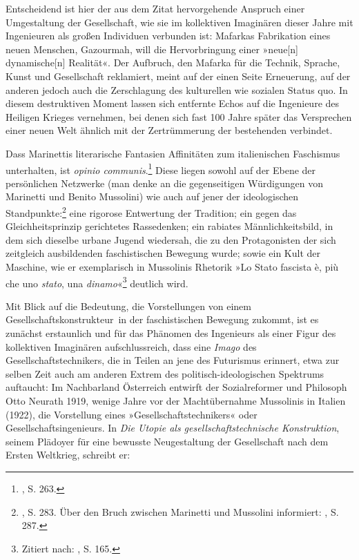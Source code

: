 \documentclass[%
	fontsize=10pt,%
	twoside,%
	headings=optiontoheadandtoc,%
	showtrims]{scrbook}
\renewenvironment{quote}{%
  \addmargin[\genericindent]{0pt}%
  \KOMAoptions{parskip=true}%
  \ifdim\parskip>0pt\else\addvspace{\intextsep}\fi
}{%
  \par
  \endaddmargin\vspace{\intextsep}
}
\renewcommand{\texttt}{\nohyphens} %
\begin{document}
\par Entscheidend ist hier der aus dem Zitat hervorgehende Anspruch einer Umgestaltung der Gesellschaft, wie sie im kollektiven Imaginären dieser Jahre mit Ingenieuren als großen Individuen verbunden ist: Mafarkas Fabrikation eines neuen Menschen, Gazourmah, will die Hervorbringung einer »neue{[}n{]} dynamische{[}n{]} Realität«. Der Aufbruch, den Mafarka für die Technik, Sprache, Kunst und Gesellschaft reklamiert, meint auf der einen Seite Erneuerung, auf der anderen jedoch auch die Zerschlagung des kulturellen wie sozialen Status quo. In diesem destruktiven Moment lassen sich entfernte Echos auf die Ingenieure des Heiligen Krieges vernehmen, bei denen sich fast 100 Jahre später das Versprechen einer neuen Welt ähnlich mit der Zertrümmerung der bestehenden verbindet.\par Dass Marinettis literarische Fantasien Affinitäten zum italienischen Faschismus unterhalten, ist \emph{opinio communis}.\footnote{\cite[][]{schmidt-bergmann2004a}, S. 263.}  Diese liegen sowohl auf der Ebene der persönlichen Netzwerke (man denke an die gegenseitigen Würdigungen von Marinetti und Benito Mussolini) wie auch auf jener der ideologischen Standpunkte:\footnote{\cite[][]{schmidt-bergmann2004a}, S. 283. Über den Bruch zwischen Marinetti und Mussolini informiert: \cite[][]{hans2015a}, S. 287.}  eine rigorose Entwertung der Tradition; ein gegen das Gleichheitsprinzip gerichtetes Rassedenken; ein rabiates Männlichkeitsbild, in dem sich dieselbe urbane Jugend wiedersah, die zu den Protagonisten der sich zeitgleich ausbildenden faschistischen Bewegung wurde; sowie ein Kult der Maschine, wie er exemplarisch in Mussolinis Rhetorik \textendash{} »Lo Stato fascista è, più che uno \emph{stato}, una \emph{dinamo}«\footnote{Zitiert nach: \cite[][]{pellizzi1924a}, S. 165.} \textendash{} deutlich wird.\par Mit Blick auf die Bedeutung, die Vorstellungen von einem \texttt{Gesellschaftskonstrukteur~in} der faschistischen Bewegung zukommt, ist es zunächst erstaunlich und für das Phänomen des Ingenieurs als einer Figur des kollektiven Imaginären aufschlussreich, dass eine \emph{Imago} des Gesellschaftstechnikers, die in Teilen an jene des Futurismus erinnert, etwa zur selben Zeit auch am anderen Extrem des politisch-ideologischen Spektrums auftaucht: Im Nachbarland Österreich entwirft der Sozialreformer und Philosoph Otto Neurath 1919, wenige Jahre vor der Machtübernahme Mussolinis in Italien (1922), die Vorstellung eines »Gesellschaftstechnikers« oder Gesellschaftsingenieurs. In \emph{Die Utopie als gesellschaftstechnische Konstruktion}, seinem Plädoyer für eine bewusste Neugestaltung der Gesellschaft nach dem Ersten Weltkrieg, schreibt er:\begin{quote}

\end{quote}
\end{document}
